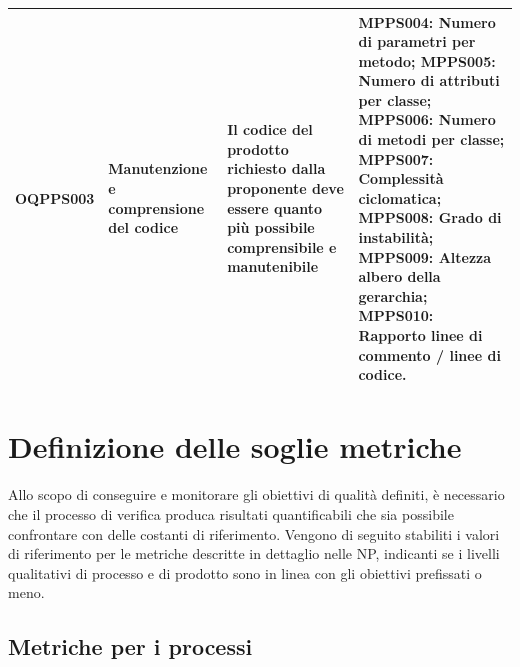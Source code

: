 \documentclass[openany,12pt,a4paper]{report}
\begin{document}
\begin{longtable}{| p{2cm} | p{3.5cm} |p{5.5cm} | p{5.5cm} |}
        	\hline
        	\newline OQPPS003 &
        	\newline Manutenzione e comprensione del codice &
        	\newline Il codice del prodotto richiesto dalla proponente deve essere quanto più possibile comprensibile e manutenibile \newline &
        	\newline MPPS004: Numero di parametri per metodo;
        	\newline MPPS005: Numero di attributi per classe;
        	\newline MPPS006: Numero di metodi per classe;
        	\newline MPPS007: Complessità ciclomatica;
        	\newline MPPS008: Grado di instabilità;
        	\newline MPPS009: Altezza albero della gerarchia;
        	\newline MPPS010: Rapporto linee di commento / linee di codice.
        	\\[1em]
        	
        	\hline
        \end{longtable}
    
	
	\section{Definizione delle soglie metriche}
	
	Allo scopo di conseguire e monitorare gli obiettivi di qualità definiti, è necessario che il processo di verifica produca risultati quantificabili che sia possibile confrontare con delle costanti di riferimento. Vengono di seguito stabiliti i valori di riferimento per le metriche descritte in dettaglio nelle NP, indicanti se i livelli qualitativi di processo e di prodotto sono in linea con gli obiettivi prefissati o meno. 	
	
	
	\subsection{Metriche per i processi}
	
\end{document}

